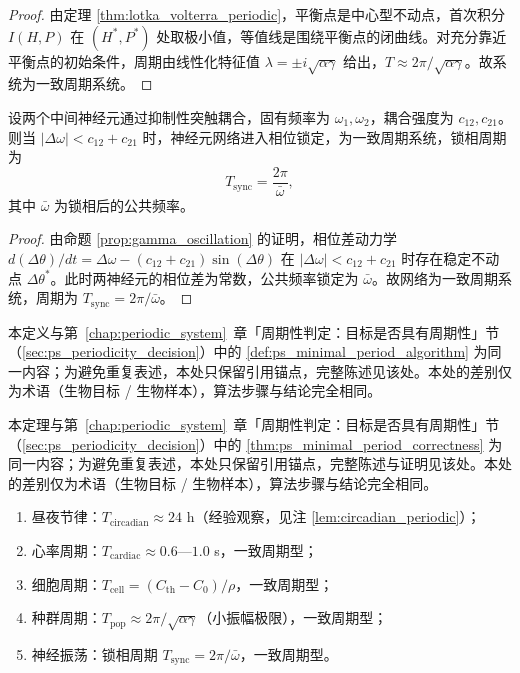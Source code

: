 \begin{proof}
由定理 \ref{thm:lotka_volterra_periodic}，平衡点是中心型不动点，首次积分 $I(H,P)$ 在 $(H^*,P^*)$ 处取极小值，等值线是围绕平衡点的闭曲线。对充分靠近平衡点的初始条件，周期由线性化特征值 $\lambda=\pm i\sqrt{\alpha\gamma}$ 给出，$T\approx 2\pi/\sqrt{\alpha\gamma}$。故系统为一致周期系统。
\end{proof}

\begin{lemma}[神经振荡的判定]\label{lem:neural_periodic}
设两个中间神经元通过抑制性突触耦合，固有频率为 $\omega_1,\omega_2$，耦合强度为 $c_{12},c_{21}$。则当 $|\Delta\omega| < c_{12}+c_{21}$ 时，神经元网络进入相位锁定，为一致周期系统，锁相周期为
\[
T_{\text{sync}} = \frac{2\pi}{\bar\omega},
\]
其中 $\bar\omega$ 为锁相后的公共频率。
\end{lemma}

\begin{proof}
由命题 \ref{prop:gamma_oscillation} 的证明，相位差动力学 $d(\Delta\theta)/dt = \Delta\omega - (c_{12}+c_{21})\sin(\Delta\theta)$ 在 $|\Delta\omega| < c_{12}+c_{21}$ 时存在稳定不动点 $\Delta\theta^*$。此时两神经元的相位差为常数，公共频率锁定为 $\bar\omega$。故网络为一致周期系统，周期为 $T_{\text{sync}}=2\pi/\bar\omega$。
\end{proof}

\begin{definition}[生物最小正周期算法]\label{def:bio_minimal_period_algorithm}
本定义与第~\ref{chap:periodic_system}~章「周期性判定：目标是否具有周期性」节（\cref{sec:ps_periodicity_decision}）中的 \cref{def:ps_minimal_period_algorithm} 为同一内容；为避免重复表述，本处只保留引用锚点，完整陈述见该处。本处的差别仅为术语（生物目标 / 生物样本），算法步骤与结论完全相同。
\end{definition}

\begin{theorem}[生物最小正周期算法的正确性]\label{thm:bio_minimal_period_correctness}
本定理与第~\ref{chap:periodic_system}~章「周期性判定：目标是否具有周期性」节（\cref{sec:ps_periodicity_decision}）中的 \cref{thm:ps_minimal_period_correctness} 为同一内容；为避免重复表述，本处只保留引用锚点，完整陈述与证明见该处。本处的差别仅为术语（生物目标 / 生物样本），算法步骤与结论完全相同。
\end{theorem}

\begin{example}[生物周期判定实例]\label{ex:bio_periodic_examples}
\begin{enumerate}[label=(\roman*)]
    \item 昼夜节律：$T_{\text{circadian}}\approx 24$ h（经验观察，见注 \ref{lem:circadian_periodic}）；
    \item 心率周期：$T_{\text{cardiac}}\approx 0.6$—$1.0$ s，一致周期型；
    \item 细胞周期：$T_{\text{cell}}=(C_{\text{th}}-C_0)/\rho$，一致周期型；
    \item 种群周期：$T_{\text{pop}}\approx 2\pi/\sqrt{\alpha\gamma}$（小振幅极限），一致周期型；
    \item 神经振荡：锁相周期 $T_{\text{sync}}=2\pi/\bar\omega$，一致周期型。
\end{enumerate}
\end{example}

